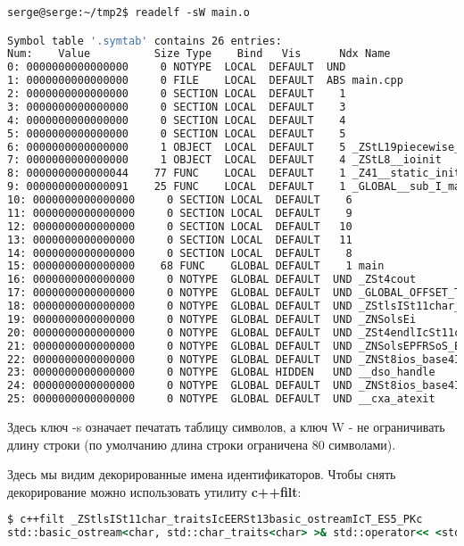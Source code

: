 \begin{lstlisting}[language=csh, numbers= none]
serge@serge:~/tmp2$ readelf -sW main.o

Symbol table '.symtab' contains 26 entries:
Num:    Value          Size Type    Bind   Vis      Ndx Name
0: 0000000000000000     0 NOTYPE  LOCAL  DEFAULT  UND
1: 0000000000000000     0 FILE    LOCAL  DEFAULT  ABS main.cpp
2: 0000000000000000     0 SECTION LOCAL  DEFAULT    1
3: 0000000000000000     0 SECTION LOCAL  DEFAULT    3
4: 0000000000000000     0 SECTION LOCAL  DEFAULT    4
5: 0000000000000000     0 SECTION LOCAL  DEFAULT    5
6: 0000000000000000     1 OBJECT  LOCAL  DEFAULT    5 _ZStL19piecewise_construct
7: 0000000000000000     1 OBJECT  LOCAL  DEFAULT    4 _ZStL8__ioinit
8: 0000000000000044    77 FUNC    LOCAL  DEFAULT    1 _Z41__static_initialization_and_destruction_0ii
9: 0000000000000091    25 FUNC    LOCAL  DEFAULT    1 _GLOBAL__sub_I_main
10: 0000000000000000     0 SECTION LOCAL  DEFAULT    6
11: 0000000000000000     0 SECTION LOCAL  DEFAULT    9
12: 0000000000000000     0 SECTION LOCAL  DEFAULT   10
13: 0000000000000000     0 SECTION LOCAL  DEFAULT   11
14: 0000000000000000     0 SECTION LOCAL  DEFAULT    8
15: 0000000000000000    68 FUNC    GLOBAL DEFAULT    1 main
16: 0000000000000000     0 NOTYPE  GLOBAL DEFAULT  UND _ZSt4cout
17: 0000000000000000     0 NOTYPE  GLOBAL DEFAULT  UND _GLOBAL_OFFSET_TABLE_
18: 0000000000000000     0 NOTYPE  GLOBAL DEFAULT  UND _ZStlsISt11char_traitsIcEERSt13basic_ostreamIcT_ES5_PKc
19: 0000000000000000     0 NOTYPE  GLOBAL DEFAULT  UND _ZNSolsEi
20: 0000000000000000     0 NOTYPE  GLOBAL DEFAULT  UND _ZSt4endlIcSt11char_traitsIcEERSt13basic_ostreamIT_T0_ES6_
21: 0000000000000000     0 NOTYPE  GLOBAL DEFAULT  UND _ZNSolsEPFRSoS_E
22: 0000000000000000     0 NOTYPE  GLOBAL DEFAULT  UND _ZNSt8ios_base4InitC1Ev
23: 0000000000000000     0 NOTYPE  GLOBAL HIDDEN   UND __dso_handle
24: 0000000000000000     0 NOTYPE  GLOBAL DEFAULT  UND _ZNSt8ios_base4InitD1Ev
25: 0000000000000000     0 NOTYPE  GLOBAL DEFAULT  UND __cxa_atexit
\end{lstlisting}

Здесь ключ -s означает печатать таблицу символов, а ключ W - не ограничивать длину строки (по умолчанию длина строки ограничена 80 символами).

Здесь мы видим декорированные имена идентификаторов. Чтобы снять декорирование можно использовать утилиту \textbf{c++filt}:

\begin{lstlisting}[language=csh]
$ c++filt _ZStlsISt11char_traitsIcEERSt13basic_ostreamIcT_ES5_PKc
std::basic_ostream<char, std::char_traits<char> >& std::operator<< <std::char_traits<char> >(std::basic_ostream<char, std::char_traits<char> >&, char const*)
\end{lstlisting}

